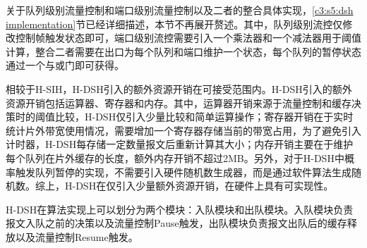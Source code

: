 
关于队列级别流量控制和端口级别流量控制以及二者的整合具体实现，\ref{c3:s5:dsh implementation}节已经详细描述，本节不再展开赘述。其中，队列级别流控仅修改控制帧触发状态即可，端口级别流控需要引入一个乘法器和一个减法器用于阈值计算，整合二者需要在出口为每个队列和端口维护一个状态，每个队列的暂停状态通过一个与或门即可获得。



相较于H-SIH，H-DSH引入的额外资源开销在可接受范围内。H-DSH引入的额外资源开销包括运算器、寄存器和内存。其中，运算器开销来源于流量控制和缓存决策时的阈值比较，H-DSH仅引入少量比较和简单运算操作；寄存器开销在于实时统计片外带宽使用情况，需要增加一个寄存器存储当前的带宽占用，为了避免引入计时器，H-DSH每存储一定数量报文后重新计算其大小；内存开销主要在于维护每个队列在片外缓存的长度，额外内存开销不超过2MB。另外，对于H-DSH中概率触发队列暂停的实现，不需要引入硬件随机数生成器，而是通过软件算法生成随机数。综上，H-DSH在仅引入少量额外资源开销，在硬件上具有可实现性。


H-DSH在算法实现上可以划分为两个模块：入队模块和出队模块。入队模块负责报文入队之前的决策以及流量控制Pause触发，出队模块负责报文出队后的缓存释放以及流量控制Resume触发。

